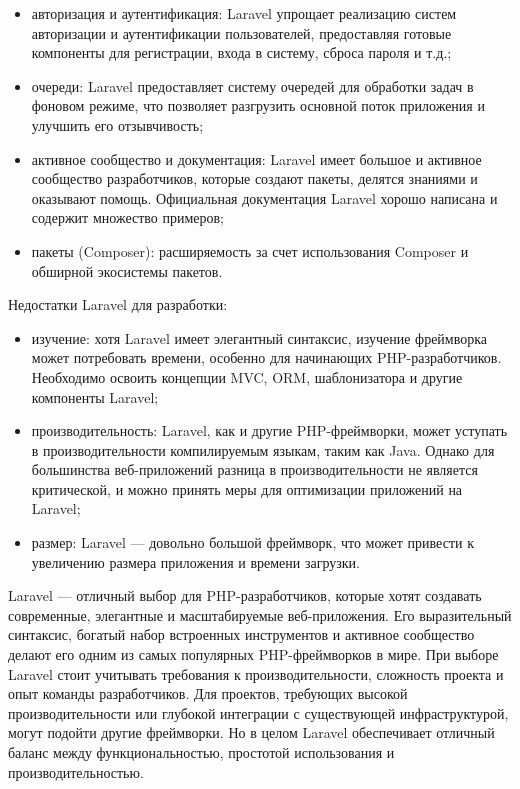 \begin{itemize}
\item	авторизация и аутентификация: Laravel упрощает реализацию систем авторизации и аутентификации пользователей, предоставляя готовые компоненты для регистрации, входа в систему, сброса пароля и т.д.;

\item	очереди: Laravel предоставляет систему очередей для обработки задач в фоновом режиме, что позволяет разгрузить основной поток приложения и улучшить его отзывчивость;

\item	активное сообщество и документация: Laravel имеет большое и активное сообщество разработчиков, которые создают пакеты, делятся знаниями и оказывают помощь. Официальная документация Laravel хорошо написана и содержит множество примеров;

\item	пакеты (Composer): расширяемость за счет использования Composer и обширной экосистемы пакетов.
\end{itemize}
Недостатки Laravel для разработки:
\begin{itemize}
\item	изучение: хотя Laravel имеет элегантный синтаксис, изучение фреймворка может потребовать времени, особенно для начинающих PHP-разработчиков. Необходимо освоить концепции MVC, ORM, шаблонизатора и другие компоненты Laravel;

\item	производительность: Laravel, как и другие PHP-фреймворки, может уступать в производительности компилируемым языкам, таким как Java. Однако для большинства веб-приложений разница в производительности не является критической, и можно принять меры для оптимизации приложений на Laravel;

\item	размер: Laravel — довольно большой фреймворк, что может привести к увеличению размера приложения и времени загрузки.
\end{itemize}
Laravel — отличный выбор для PHP-разработчиков, которые хотят создавать современные, элегантные и масштабируемые веб-приложения. Его выразительный синтаксис, богатый набор встроенных инструментов и активное сообщество делают его одним из самых популярных PHP-фреймворков в мире. При выборе Laravel стоит учитывать требования к производительности, сложность проекта и опыт команды разработчиков. Для проектов, требующих высокой производительности или глубокой интеграции с существующей инфраструктурой, могут подойти другие фреймворки. Но в целом Laravel обеспечивает отличный баланс между функциональностью, простотой использования и производительностью.


